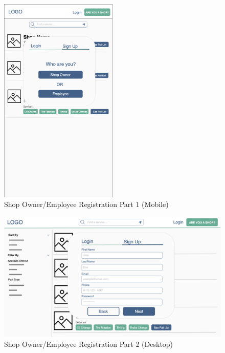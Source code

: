 \documentclass[12pt, titlepage]{article}
\begin{document}
\begin{figure}[H]
	\centering
	\includegraphics[width=0.5\textwidth]{mockups/Shop Sign Up (Mobile).png}
	\caption{Shop Owner/Employee Registration \textemdash{} Part 1 (Mobile)}
\end{figure}

\begin{figure}[H]
	\centering
	\includegraphics[width=\textwidth]{mockups/Shop Sign Up (Part 1) (Desktop).png}
	\caption{Shop Owner/Employee Registration \textemdash{} Part 2 (Desktop)}
\end{figure}
\end{document}
